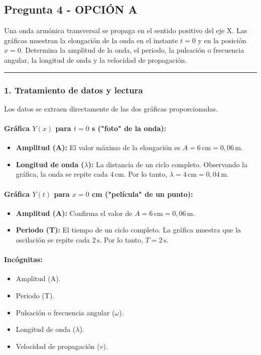 \subsection{Pregunta 4 - OPCIÓN A}
\label{subsec:4A_2025_jun_ord}

\begin{cajaenunciado}
Una onda armónica transversal se propaga en el sentido positivo del eje X. Las gráficas muestran la elongación de la onda en el instante $t=0$ y en la posición $x=0$. Determina la amplitud de la onda, el periodo, la pulsación o frecuencia angular, la longitud de onda y la velocidad de propagación.
\end{cajaenunciado}
\hrule

\subsubsection*{1. Tratamiento de datos y lectura}
Los datos se extraen directamente de las dos gráficas proporcionadas.
\paragraph*{Gráfica $Y(x)$ para $t=0$ s ("foto" de la onda):}
\begin{itemize}
    \item \textbf{Amplitud (A):} El valor máximo de la elongación es $A = 6 \, \text{cm} = 0,06 \, \text{m}$.
    \item \textbf{Longitud de onda ($\lambda$):} La distancia de un ciclo completo. Observando la gráfica, la onda se repite cada $4 \, \text{cm}$. Por lo tanto, $\lambda = 4 \, \text{cm} = 0,04 \, \text{m}$.
\end{itemize}
\paragraph*{Gráfica $Y(t)$ para $x=0$ cm ("película" de un punto):}
\begin{itemize}
    \item \textbf{Amplitud (A):} Confirma el valor de $A = 6 \, \text{cm} = 0,06 \, \text{m}$.
    \item \textbf{Periodo (T):} El tiempo de un ciclo completo. La gráfica muestra que la oscilación se repite cada $2 \, \text{s}$. Por lo tanto, $T = 2 \, \text{s}$.
\end{itemize}
\paragraph*{Incógnitas:}
\begin{itemize}
    \item Amplitud (A).
    \item Periodo (T).
    \item Pulsación o frecuencia angular ($\omega$).
    \item Longitud de onda ($\lambda$).
    \item Velocidad de propagación ($v$).
\end{itemize}

